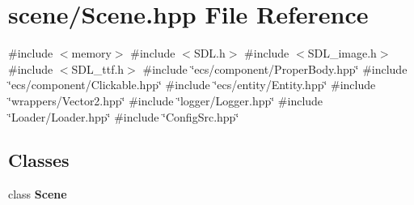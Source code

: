 \section{scene/\+Scene.hpp File Reference}
\label{_scene_8hpp}
{\ttfamily \#include $<$memory$>$}\newline
{\ttfamily \#include $<$S\+D\+L.\+h$>$}\newline
{\ttfamily \#include $<$S\+D\+L\+\_\+image.\+h$>$}\newline
{\ttfamily \#include $<$S\+D\+L\+\_\+ttf.\+h$>$}\newline
{\ttfamily \#include \char`\"{}ecs/component/\+Proper\+Body.\+hpp\char`\"{}}\newline
{\ttfamily \#include \char`\"{}ecs/component/\+Clickable.\+hpp\char`\"{}}\newline
{\ttfamily \#include \char`\"{}ecs/entity/\+Entity.\+hpp\char`\"{}}\newline
{\ttfamily \#include \char`\"{}wrappers/\+Vector2.\+hpp\char`\"{}}\newline
{\ttfamily \#include \char`\"{}logger/\+Logger.\+hpp\char`\"{}}\newline
{\ttfamily \#include \char`\"{}Loader/\+Loader.\+hpp\char`\"{}}\newline
{\ttfamily \#include \char`\"{}Config\+Src.\+hpp\char`\"{}}\newline
\subsection*{Classes}
\begin{DoxyCompactItemize}
\item 
class \textbf{ Scene}
\end{DoxyCompactItemize}
